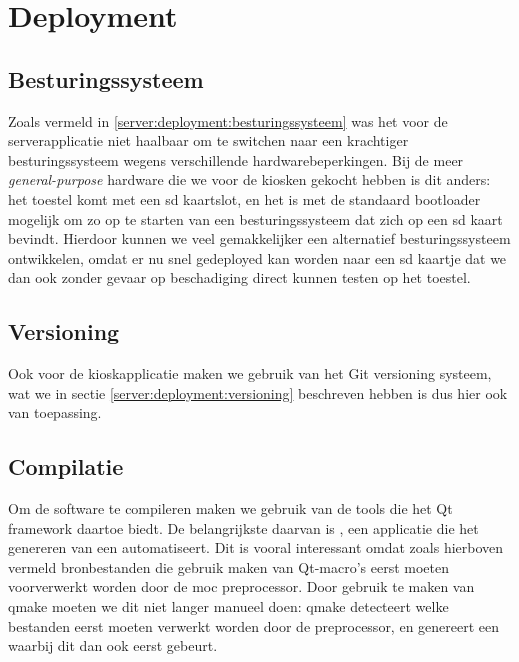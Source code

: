 \chapter{Deployment}
\label{kiosk:deployment}

\section{Besturingssysteem}
\label{kiosk:deployment:besturingssysteem}

Zoals vermeld in \ref{server:deployment:besturingssysteem} was het voor de serverapplicatie niet haalbaar om te switchen naar een krachtiger besturingssysteem wegens verschillende hardwarebeperkingen. Bij de meer \emph{general-purpose} hardware die we voor de kiosken gekocht hebben is dit anders: het toestel komt met een \ac{sd} kaartslot, en het is met de standaard bootloader mogelijk om zo op te starten van een besturingssysteem dat zich op een \ac{sd} kaart bevindt. Hierdoor kunnen we veel gemakkelijker een alternatief besturingssysteem ontwikkelen, omdat er nu snel gedeployed kan worden naar een \ac{sd} kaartje dat we dan ook zonder gevaar op beschadiging direct kunnen testen op het toestel.


\section{Versioning}
\label{kiosk:deployment:versioning}

Ook voor de kioskapplicatie maken we gebruik van het Git versioning systeem, wat we in sectie \ref{server:deployment:versioning} beschreven hebben is dus hier ook van toepassing.

\section{Compilatie}
\label{kiosk:deployment:compilatie}

Om de software te compileren maken we gebruik van de tools die het Qt framework daartoe biedt. De belangrijkste daarvan is , een applicatie die het genereren van een  automatiseert. Dit is vooral interessant omdat zoals hierboven vermeld bronbestanden die gebruik maken van Qt-macro's eerst moeten voorverwerkt worden door de \ac{moc} preprocessor. Door gebruik te maken van qmake moeten we dit niet langer manueel doen: qmake detecteert welke bestanden eerst moeten verwerkt worden door de preprocessor, en genereert een  waarbij dit dan ook eerst gebeurt.

